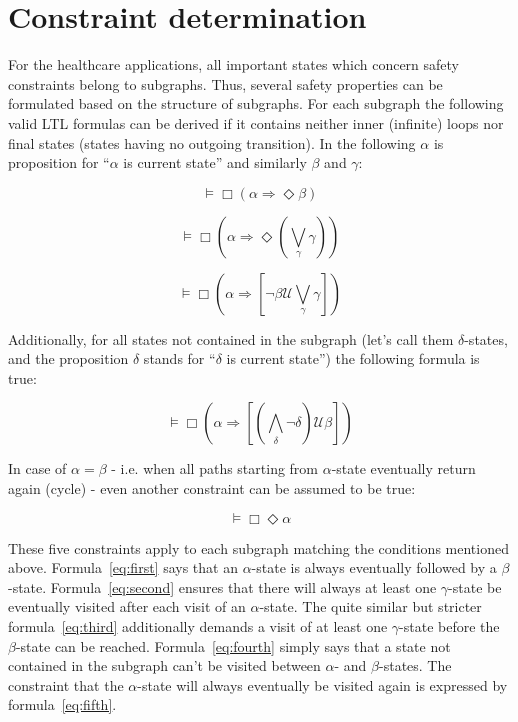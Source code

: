 \section{Constraint determination}

For the healthcare applications, all important states which concern safety constraints belong to subgraphs. Thus, several safety properties can be formulated based on the structure of subgraphs.
For each subgraph the following valid LTL formulas can be derived if it contains neither inner (infinite) loops nor final states (states having no outgoing transition). In the following $\alpha$ is proposition for ``$\alpha$ is current state'' and similarly $\beta$ and $\gamma$:

\begin{equation} \label{eq:first}
  \models \Box (\alpha \Rightarrow \Diamond \beta)
\end{equation}

\begin{equation} \label{eq:second}
  \models \Box (\alpha \Rightarrow \Diamond (\bigvee_{\gamma} \gamma))
\end{equation}

\begin{equation} \label{eq:third}
  \models \Box (\alpha \Rightarrow [\neg \beta \mathcal{U} \bigvee_{\gamma} \gamma])
\end{equation}

Additionally, for all states not contained in the subgraph (let's call them $\delta$-states, and the proposition $\delta$ stands for ``$\delta$ is current state'') the following formula is true: 

\begin{equation} \label{eq:fourth}
  \models \Box (\alpha \Rightarrow [(\bigwedge_{\delta} \neg \delta) \mathcal{U} \beta])
\end{equation}

In case of $\alpha = \beta$ - i.e. when all paths starting from $\alpha$-state eventually return again (cycle) - even another constraint can be assumed to be true:

\begin{equation} \label{eq:fifth}
  \models \Box \Diamond \alpha
\end{equation}
 

These five constraints apply to each subgraph matching the conditions mentioned above. Formula~\ref{eq:first} says that an $\alpha$-state is always eventually followed by a $\beta$-state. Formula~\ref{eq:second} ensures that there will always at least one $\gamma$-state be eventually visited after each visit of an $\alpha$-state. The quite similar but stricter formula~\ref{eq:third} additionally demands a visit of at least one $\gamma$-state before the $\beta$-state can be reached. Formula~\ref{eq:fourth} simply says that a state not contained in the subgraph can't be visited between $\alpha$- and $\beta$-states. The constraint that the $\alpha$-state will always eventually be visited again is expressed by formula~\ref{eq:fifth}.

